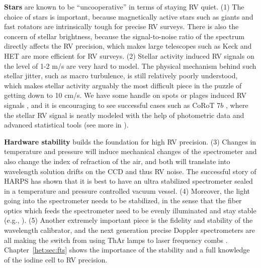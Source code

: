 {\bf Stars} are known to be ``uncooperative'' in terms of staying RV
quiet. (1) The choice of stars is important, because magnetically
active stars such as giants and fast rotators are intrinsically tough
for precise RV surveys. There is also the concern of stellar
brightness, because the signal-to-noise ratio of the spectrum directly
affects the RV precision, which makes large telescopes such as Keck
and HET are more efficient for RV surveys. (2) Stellar activity
induced RV signals on the level of 1-2 m/s are very hard to model. The
physical mechanism behind such stellar jitter, such as macro
turbulence, is still relatively poorly understood, which makes stellar
activity arguably the most difficult piece in the puzzle of getting
down to 10 cm/s. We have some handle on spots or plages induced RV
signals \citep{2014ApJ...796..132D}, and it is encouraging to see
successful cases such as CoRoT 7$b$ \citep{2014MNRAS.443.2517H}, where
the stellar RV signal is neatly modeled with the help of photometric
data and advanced statistical tools (see more in
\citealt{2016MNRAS.tmp..650V}).

{\bf Hardware stability} builds the foundation for high RV
precision. (3) Changes in temperature and pressure will induce
mechanical changes of the spectrometer and also change the index of
refraction of the air, and both will translate into wavelength
solution drifts on the CCD and thus RV noise. The successful story of
HARPS has shown that it is best to have an ultra stabilized
spectrometer sealed in a temperature and pressure controlled vacuum
vessel. (4) Moreover, the light going into the spectrometer needs to
be stabilized, in the sense that the fiber optics which feeds the
spectrometer need to be evenly illuminated and stay stable (e.g.,
\citealt{2015ApJ...806...61H}). (5) Another extremely important piece
is the fidelity and stability of the wavelength calibrator, and the
next generation precise Doppler spectrometers are all making the
switch from using ThAr lamps to laser frequency combs
\citep{2008Natur.452..610L,2016NatCo...710436Y}. Chapter~\ref{het:sec:fts}
shows the importance of the stability and a full knowledge of the
iodine cell to RV precision.

